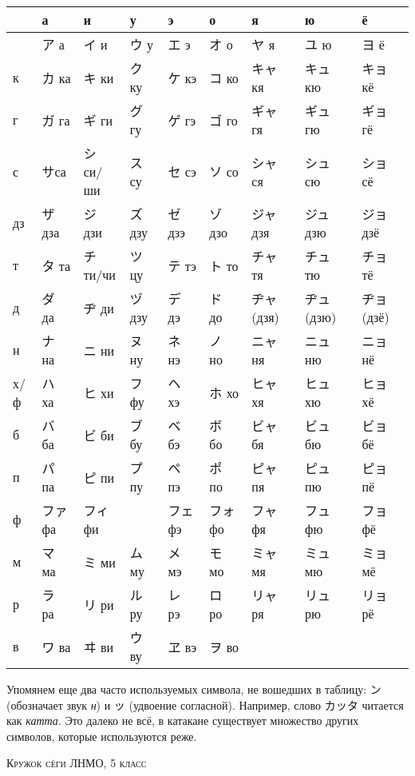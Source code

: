 \documentclass[10pt]{scrartcl}
\begin{document}
\begin{CJK}{UTF8}{min}
\begin{center}
\noindent\begin{tabular}{l|p{1.69cm}p{1.69cm}p{1.69cm}p{1.69cm}p{1.69cm}p{1.69cm}p{1.69cm}p{1.69cm}}
 & а & и & у & э & о & я & ю & ё\\
\hline
       &  ア а & イ и & ウ у & エ э & オ о & ヤ я & ユ ю& ヨ ё\\
к      &  カ ка &      キ  ки       &    ク  ку       &     ケ  кэ    & コ  ко  & キャ кя  &  キュ кю & キョ  кё \\
г      &   ガ  га  &  ギ  ги   &        グ  гу    &        ゲ  гэ      &       ゴ  го & ギャ гя &	ギュ гю &ギョ гё\\
с    &    サса    &   シ  си/ши &  ス  су    &        セ сэ     &        ソ  со &シャ ся &	シュ сю & ショ сё\\
дз   &            ザ дза  &    ジ  дзи   &      ズ  дзу      &     ゼ  дзэ   &        ゾ  дзо & ジャ дзя & ジュ дзю & ジョ дзё\\
т  &                 タ та  &     チ  ти/чи  &   ツ  цу    &         テ  тэ     &       ト  то&チャ тя &チュ тю &チョ тё\\
д  &                ダ  да    &  ヂ ди     &      ヅ  дзу    &       デ  дэ       &     ド  до & ヂャ (дзя) &ヂュ (дзю) &ヂョ (дзё)\\
н &                 ナ  на   &   ニ  ни     &     ヌ  ну       &      ネ  нэ    &        ノ  но & ニャ ня &ニュ ню &ニョ нё \\
х/ф &                 ハ  ха   &    ヒ  хи    &     フ  фу     &        ヘ  хэ      &      ホ  хо&ヒャ хя &ヒュ хю &ヒョ хё\\
б  &                バ  ба  &     ビ  би   &       ブ  бу     &         ベ  бэ     &        ボ  бо&ビャ бя &ビュ бю &ビョ бё\\
п  &                パ  па    &   ピ  пи      &   プ  пу     &       ペ  пэ        &     ポ  по&ピャ пя &ピュ пю &ピョ пё\\
ф  &                  ファ  фа &  フィ  фи     &                 &       フェ  фэ    &    フォ фо&フャ фя &フュ фю &フョ фё\\
м &                  マ ма    &  ミ  ми     &     ム  му   &         メ  мэ      &      モ  мо&ミャ мя &ミュ мю &ミョ мё\\
р  &                ラ  ра     &  リ  ри     &      ル  ру    &         レ  рэ     &        ロ  ро&リャ ря &リュ рю &リョ рё\\
в &                 ワ ва    &     ヰ  ви     &     ウ  ву  &    ヱ  вэ      &       ヲ  во
\end{tabular}
\end{center}


Упомянем еще два часто используемых символа, не вошедших в таблицу:  ン 
(обозначает звук \emph{н}) и  ッ (удвоение согласной). Например, слово カッタ читается как \emph{катта}.
Это далеко не всё, в катакане существует множество других символов, которые используются реже.

\vspace{1cm}
\begin{center}{\scshape Кружок сёги ЛНМО, 5 класс}\end{center}
\end{CJK}
\end{document}
